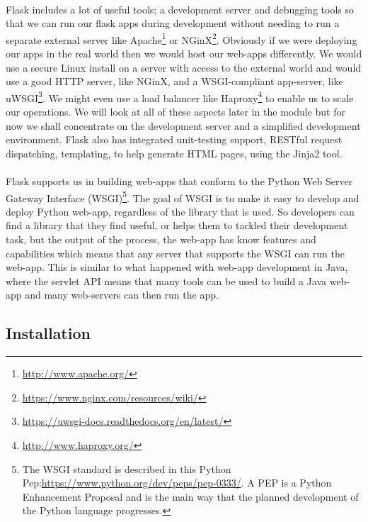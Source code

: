\documentclass[12pt, a4paper, oneside]{book}
\begin{document}
\paragraph{} Flask includes a lot of useful tools; a development server and debugging tools so that we can run our flask apps during development without needing to run a separate external server like Apache\footnote{\url{http://www.apache.org/}} or NGinX\footnote{\url{https://www.nginx.com/resources/wiki/}}. Obviously if we were deploying our apps in the real world then we would host our web-apps differently. We would use a secure Linux install on a server with access to the external world and would use a good HTTP server, like NGinX, and a WSGI-compliant app-server, like uWSGI\footnote{\url{https://uwsgi-docs.readthedocs.org/en/latest/}}. We might even use a load balancer like Haproxy\footnote{\url{http://www.haproxy.org/}} to enable us to scale our operations. We will look at all of these aspects later in the module but for now we shall concentrate on the development server and a simplified development environment. Flask also has integrated unit-testing support, RESTful request dispatching, templating, to help generate HTML pages, using the Jinja2 tool.

\paragraph{} Flask supports us in building web-apps that conform to the Python Web Server Gateway Interface (WSGI)\footnote{The WSGI standard is described in this Python Pep:\url{https://www.python.org/dev/peps/pep-0333/}. A PEP is a Python Enhancement Proposal and is the main way that the planned development of the Python language progresses.}. The goal of WSGI is to make it easy to develop and deploy Python web-app, regardless of the library that is used. So developers can find a library that they find useful, or helps them to tackled their development task, but the output of the process, the web-app has know features and capabilities which means that any server that supports the WSGI can run the web-app. This is similar to what happened with web-app development in Java, where the servlet API means that many tools can be used to build a Java web-app and many web-servers can then run the app.

\subsection{Installation}
\end{document}
